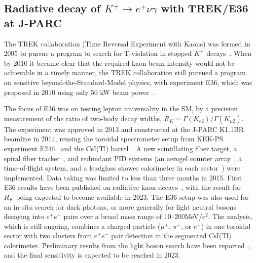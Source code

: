 \subsection{Radiative decay of \texorpdfstring{$K^+ \rightarrow e^+ \nu \gamma$}{K+ -> e+ nu g} with TREK/E36 at J-PARC}


The TREK collaboration (Time Reversal Experiment with Kaons)
was formed in 2005 to pursue a program to search for T-violation in stopped
$K^+$ decays~\cite{e06_proposal}.
When by 2010 it became clear that the
required kaon beam intensity would not be achievable in a timely manner, the
TREK collaboration still pursued a program on sensitive
beyond-the-Standard-Model physics, with experiment E36, which was proposed in
2010 using only 50 kW beam power~\cite{e36_proposal,e36_proposal-addend,e36_proposal-addend2}.

The focus of E36 was on testing lepton universality in the
SM, by a precision measurement of the ratio of two-body decay widths,
$R_K = \Gamma(K_{e2})/\Gamma(K_{\mu2})$.
The experiment was approved in 2013 and constructed at the J-PARC K1.1BR
beamline in 2014, reusing the toroidal spectrometer setup from KEK-PS
experiment E246~\cite{e246_NIM} and the CsI(Tl) barrel~\cite{ito_csi}.
A new scintillating fiber target,
a spiral fiber tracker~\cite{sft}, and
redundant PID systems (an aerogel counter array~\cite{ac},
a time-of-flight system, and
a leadglass shower calorimeter in each sector~\cite{pgc}) were implemented.
Data taking was limited to less than three months in 2015. First E36 results
have been published on radiative kaon
decays~\cite{e36_Ke2g_CsI,e36_Ke2g_GSC},
with the result for $R_K$ being expected to become available in 2023.
The E36 setup was also used for an in-situ search for dark photons, or more
generally for light neutral bosons decaying into $e^+ e^-$ pairs over a broad
mass range of 10--200\;MeV/c$^2$.
The analysis, which is still ongoing, combines a charged particle
($\mu^+$, $\pi^+$, or $e^+$) in one toroidal sector with two clusters from
$e^+ e^-$ pair detection in the segmented CsI(Tl) calorimeter.
Preliminary results from the light boson search have been
reported~\cite{e36_dp}, and the
final sensitivity is expected to be reached in 2023.

